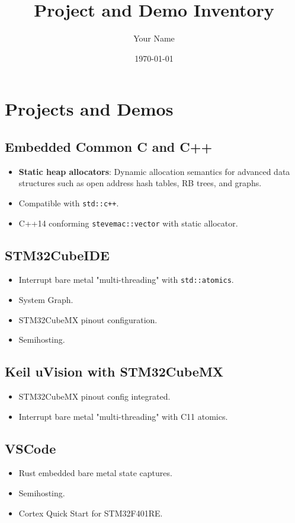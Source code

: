 \documentclass{article}
\title{Project and Demo Inventory}
\author{Your Name}
\date{\today}
\begin{document}
\maketitle

\section*{Projects and Demos}

\subsection*{Embedded Common C and C++}
\begin{itemize}
    \item \textbf{Static heap allocators}: Dynamic allocation semantics for advanced data structures such as open address hash tables, RB trees, and graphs.
    \item Compatible with \texttt{std::c++}.
    \item C++14 conforming \texttt{stevemac::vector} with static allocator.
\end{itemize}

\subsection*{STM32CubeIDE}
\begin{itemize}
    \item Interrupt bare metal "multi-threading" with \texttt{std::atomics}.
    \item System Graph.
    \item STM32CubeMX pinout configuration.
    \item Semihosting.
\end{itemize}

\subsection*{Keil uVision with STM32CubeMX}
\begin{itemize}
    \item STM32CubeMX pinout config integrated.
    \item Interrupt bare metal "multi-threading" with C11 atomics.
\end{itemize}

\subsection*{VSCode}
\begin{itemize}
    \item Rust embedded bare metal state captures.
    \item Semihosting.
    \item Cortex Quick Start for STM32F401RE.
\end{itemize}
\end{document}
